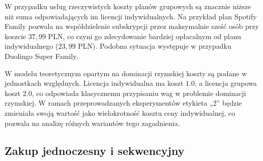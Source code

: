 W przypadku usług rzeczywistych koszty planów grupowych są znacznie niższe niż suma odpowiadających im licencji indywidualnych. Na przykład plan Spotify Family pozwala na współdzielenie subskrypcji przez maksymalnie sześć osób przy koszcie $37{,}99$ PLN, co czyni go zdecydowanie bardziej opłacalnym od planu indywidualnego ($23{,}99$ PLN). Podobna sytuacja występuje w przypadku Duolingo Super Family.

W modelu teoretycznym opartym na dominacji rzymskiej koszty są podane w jednostkach względnych. Licencja indywidualna ma koszt $1.0$, a licencja grupowa koszt $2.0$, co odpowiada klasycznemu przypisaniu wag w problemie dominacji rzymskiej. W ramach przeprowadzanych eksperymentów etykieta „2” będzie zmieniała swoją wartość jako wielokrotność kosztu ceny indywidualnej, co pozwala na analizę różnych wariantów tego zagadnienia.






\subsection{Zakup jednoczesny i sekwencyjny}

